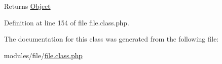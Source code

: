 \begin{DoxyReturn}{Returns}
\hyperlink{classObject}{Object} 
\end{DoxyReturn}


Definition at line 154 of file file.\-class.\-php.



The documentation for this class was generated from the following file\-:\begin{DoxyCompactItemize}
\item 
modules/file/\hyperlink{file_8class_8php}{file.\-class.\-php}\end{DoxyCompactItemize}
